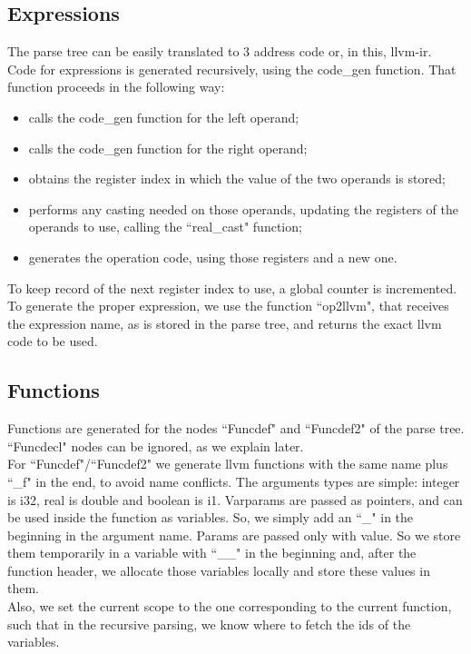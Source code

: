 \documentclass[12pt]{article}
\begin{document}
\subsection{Expressions}

The parse tree can be easily translated to 3 address code or, in this, llvm-ir. \\
Code for expressions is generated recursively, using the code\_gen function. That function proceeds in the following way:
\begin{itemize}
	\item calls the code\_gen function for the left operand;
	\item calls the code\_gen function for the right operand;
	\item obtains the register index in which the value of the two operands is stored;
	\item performs any casting needed on those operands, updating the registers of the operands to use, calling the ``real\_cast" function;
	\item generates the operation code, using those registers and a new one.
\end{itemize}

To keep record of the next register index to use, a global counter is incremented. \\
To generate the proper expression, we use the function ``op2llvm", that receives the expression name, as is stored in the parse tree, and returns the exact llvm code to be used.\\

\subsection{Functions}

Functions are generated for the nodes ``Funcdef" and ``Funcdef2" of the parse tree. ``Funcdecl" nodes can be ignored, as we explain later. \\
For ``Funcdef"/``Funcdef2" we generate llvm functions with the same name plus ``_f" in the end, to avoid name conflicts. The arguments types are simple: integer is i32, real is double and boolean is i1. Varparams are passed as pointers, and can be used inside the function as variables. So, we simply add an ``\_" in the beginning in the argument name. Params are passed only with value. So we store them temporarily in a variable with ``\_\_" in the beginning and, after the function header, we allocate those variables locally and store these values in them. \\
Also, we set the current scope to the one corresponding to the current function, such that in the recursive parsing, we know where to fetch the ids of the variables.
\end{document}
